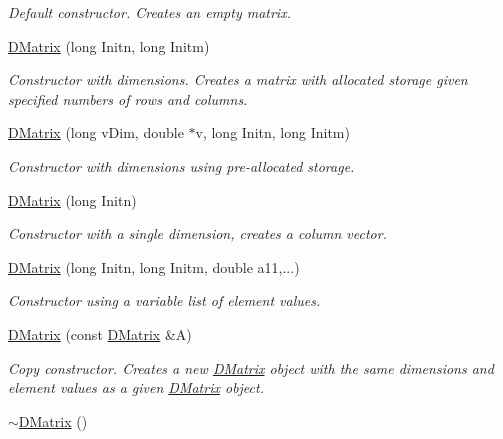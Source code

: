 \begin{DoxyCompactItemize}
\begin{DoxyCompactList}\small\item\em Default constructor. Creates an empty matrix. \item\end{DoxyCompactList}\item 
\hyperlink{classDMatrix_ae3911763fdae4b6f4d41772031c9a2da}{DMatrix} (long Initn, long Initm)
\begin{DoxyCompactList}\small\item\em Constructor with dimensions. Creates a matrix with allocated storage given specified numbers of rows and columns. \item\end{DoxyCompactList}\item 
\hyperlink{classDMatrix_a4751cd36f1eb0b65f4c25eced0142192}{DMatrix} (long vDim, double $\ast$v, long Initn, long Initm)
\begin{DoxyCompactList}\small\item\em Constructor with dimensions using pre-\/allocated storage. \item\end{DoxyCompactList}\item 
\hyperlink{classDMatrix_a7e8d467c27e1dc57c2cdae0c28efea21}{DMatrix} (long Initn)
\begin{DoxyCompactList}\small\item\em Constructor with a single dimension, creates a column vector. \item\end{DoxyCompactList}\item 
\hyperlink{classDMatrix_a823b4bf5f2957ea5c2d9339292237234}{DMatrix} (long Initn, long Initm, double a11,...)
\begin{DoxyCompactList}\small\item\em Constructor using a variable list of element values. \item\end{DoxyCompactList}\item 
\hyperlink{classDMatrix_af8ff7b8c264b0390e20c2c9c58a03b64}{DMatrix} (const \hyperlink{classDMatrix}{DMatrix} \&A)
\begin{DoxyCompactList}\small\item\em Copy constructor. Creates a new \hyperlink{classDMatrix}{DMatrix} object with the same dimensions and element values as a given \hyperlink{classDMatrix}{DMatrix} object. \item\end{DoxyCompactList}\item 
\hypertarget{classDMatrix_a06129166d2e2166192f1f35841d1c0e5}{
\hyperlink{classDMatrix_a06129166d2e2166192f1f35841d1c0e5}{$\sim$DMatrix} ()}
\label{classDMatrix_a06129166d2e2166192f1f35841d1c0e5}


\end{DoxyCompactItemize}
